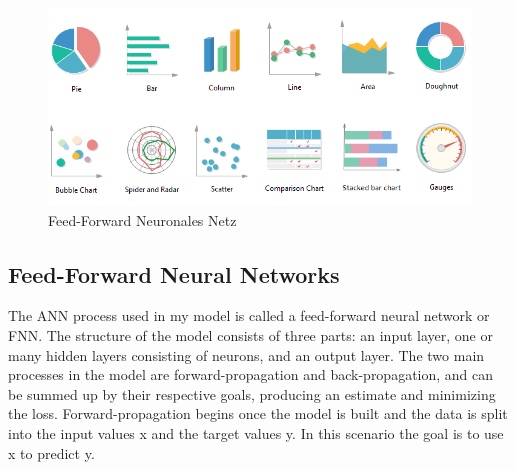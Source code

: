\documentclass[12pt]{article}
\begin{document}
            \begin{figure}[htp]
            
                \begin{center}

                    \includegraphics[scale=0.5]{types-of-graphs.png}
                    \caption{Feed-Forward Neuronales Netz \cite{bishop1995}}
        
                \end{center}
                
            \end{figure}
        
            

        \subsection{Feed-Forward Neural Networks}

            The ANN process used in my model is called a feed-forward neural network or FNN. 
            The structure of the model consists of three parts: 
            an input layer, one or many hidden layers consisting of neurons, and an output layer. 
            The two main processes in the model are forward-propagation and back-propagation, 
            and can be summed up by their respective goals, producing an estimate and minimizing the loss. 
            Forward-propagation begins once the model is built and the data is split into the input values x and the target values y. 
            In this scenario the goal is to use x to predict y.  
\end{document}
